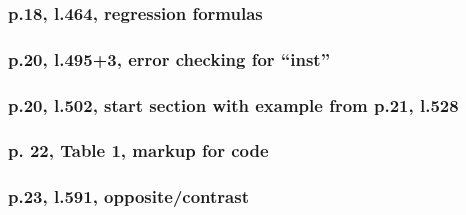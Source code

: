 \documentclass[12pt,english]{scrartcl}
\begin{document}
\subsubsection{p.18, l.464, regression formulas}

\subsubsection{p.20, l.495+3, error checking for ``inst''}

\subsubsection{p.20, l.502, start section with example from p.21, l.528}

\subsubsection{p. 22, Table 1, markup for code}

\subsubsection{p.23, l.591, opposite/contrast}
\end{document}
